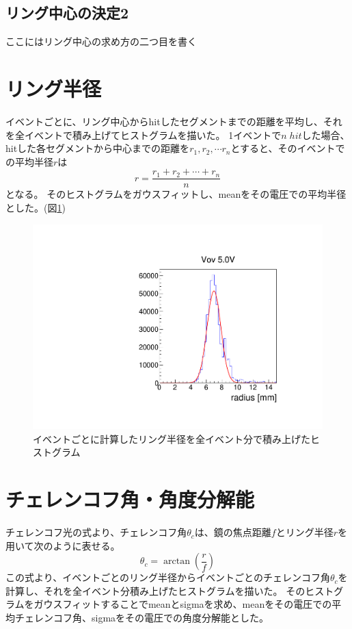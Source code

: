 \documentclass[uplatex, titlepage, dvipdfmx, 12pt, a4paper]{jsreport}
\begin{document}
    \subsection{リング中心の決定2}
      ここにはリング中心の求め方の二つ目を書く
    \section{リング半径}
    イベントごとに、リング中心からhitしたセグメントまでの距離を平均し、それを全イベントで積み上げてヒストグラムを描いた。
    1イベントで$n\;\si{hit}$した場合、hitした各セグメントから中心までの距離を$r_1, r_2, \cdots r_n$とすると、そのイベントでの平均半径$r$は
    \begin{equation}
      r = \frac{r_1 + r_2 + \cdots + r_n}{n} \nonumber
    \end{equation}
    となる。
    そのヒストグラムをガウスフィットし、meanをその電圧での平均半径とした。(図\ref{fig:5Vradius})
    \begin{figure}[hbtp]
      \begin{center} 
        \includegraphics[scale=0.5, clip]{image/radius.pdf}
        \caption{イベントごとに計算したリング半径を全イベント分で積み上げたヒストグラム} 
        \label{fig:5Vradius} 
      \end{center}
    \end{figure}
    
    
    
    \section{チェレンコフ角・角度分解能}
      チェレンコフ光の式より、チェレンコフ角$\theta_{c}$は、鏡の焦点距離$f$とリング半径$r$を用いて次のように表せる。
      \begin{equation}
        \theta_{c} = \arctan \left(\frac{r}{f} \right)
        \label{theta_radius}
      \end{equation}
      この式より、イベントごとのリング半径からイベントごとのチェレンコフ角$\theta_{c}$を計算し、それを全イベント分積み上げたヒストグラムを描いた。
      そのヒストグラムをガウスフィットすることでmeanとsigmaを求め、meanをその電圧での平均チェレンコフ角、sigmaをその電圧での角度分解能とした。
\end{document}
